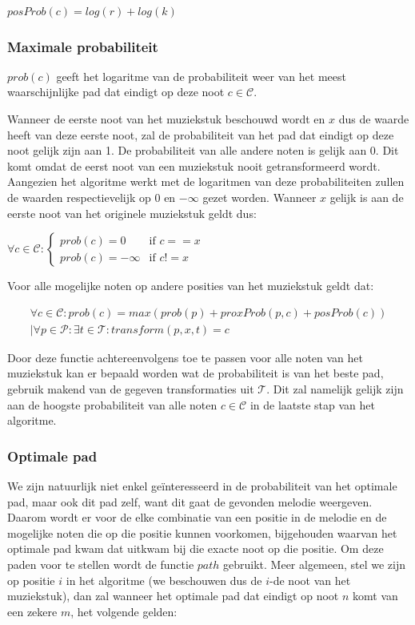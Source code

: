 \begin{framed}
\noindent
$posProb(c)=log(r) + log(k)$
\end{framed}

\subsubsection{Maximale probabiliteit}
$prob(c)$ geeft het logaritme van de probabiliteit weer van het meest waarschijnlijke pad dat eindigt op deze noot $c\in \mathcal{C}$.

Wanneer de eerste noot van het muziekstuk beschouwd wordt en $x$ dus de waarde heeft van deze eerste noot, zal de probabiliteit van het pad dat eindigt op deze noot gelijk zijn aan 1. De probabiliteit van alle andere noten is gelijk aan 0. Dit komt omdat de eerst noot van een muziekstuk nooit getransformeerd wordt. Aangezien het algoritme werkt met de logaritmen van deze probabiliteiten zullen de waarden respectievelijk op 0 en $-\infty$ gezet worden. Wanneer $x$ gelijk is aan de eerste noot van het originele muziekstuk geldt dus:

\begin{framed}
\noindent
$\forall c\in \mathcal{C}: \begin{cases} 
prob(c)=0 &\mbox{if } c==x\\ 
prob(c)=-\infty &\mbox{if } c!=x \end{cases}$
\end{framed}

Voor alle mogelijke noten op andere posities van het muziekstuk geldt dat:

\begin{framed}
\noindent
\begin{multline}
\forall c\in \mathcal{C}: 
prob(c) = max(prob(p) + proxProb(p,c) + posProb(c)) \\
| \forall p\in \mathcal{P}: \exists t\in \mathcal{T}: transform(p,x,t)=c
\end{multline}
\end{framed}

Door deze functie achtereenvolgens toe te passen voor alle noten van het muziekstuk kan er bepaald worden wat de probabiliteit is van het beste pad, gebruik makend van de gegeven transformaties uit $\mathcal{T}$. Dit zal namelijk gelijk zijn aan de hoogste probabiliteit van alle noten $c\in \mathcal{C}$ in de laatste stap van het algoritme.

\subsubsection{Optimale pad}
We zijn natuurlijk niet enkel ge\"interesseerd in de probabiliteit van het optimale pad, maar ook dit pad zelf, want dit gaat de gevonden melodie weergeven. Daarom wordt er voor de elke combinatie van een positie in de melodie en de mogelijke noten die op die positie kunnen voorkomen, bijgehouden waarvan het optimale pad kwam dat uitkwam bij die exacte noot op die positie. Om deze paden voor te stellen wordt de functie $path$ gebruikt. Meer algemeen, stel we zijn op positie $i$ in het algoritme (we beschouwen dus de $i$-de noot van het muziekstuk), dan zal wanneer het optimale pad dat eindigt op noot $n$ komt van een zekere $m$, het volgende gelden:

